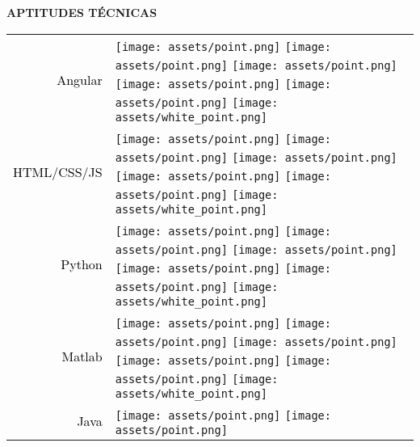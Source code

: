 \documentclass[../main.tex]{subfiles}
\begin{document}
\vspace*{0.5cm}

\textbf{\textcolor{myCV2}{APTITUDES TÉCNICAS\underline{\hspace{3.5cm}}}}
\vspace*{0.2cm}

    \begin{tabular}{r l}
    \textcolor{black}{\vspace*{0.1cm}Angular} &            
            \texttt{[image: assets/point.png]}
            \texttt{[image: assets/point.png]}
            \texttt{[image: assets/point.png]}
            \texttt{[image: assets/point.png]}
            \texttt{[image: assets/point.png]}
            \texttt{[image: assets/white\_point.png]}\\
    \textcolor{black}{\vspace*{0.1cm}HTML/CSS/JS} &
            \texttt{[image: assets/point.png]}
            \texttt{[image: assets/point.png]}
            \texttt{[image: assets/point.png]}
            \texttt{[image: assets/point.png]}
            \texttt{[image: assets/point.png]}
            \texttt{[image: assets/white\_point.png]}\\
    \textcolor{black}{\vspace*{0.1cm}Python} &
            \texttt{[image: assets/point.png]}
            \texttt{[image: assets/point.png]}
            \texttt{[image: assets/point.png]}
            \texttt{[image: assets/point.png]}
            \texttt{[image: assets/point.png]}
            \texttt{[image: assets/white\_point.png]}\\
    \textcolor{black}{\vspace*{0.1cm}Matlab} &
            \texttt{[image: assets/point.png]}
            \texttt{[image: assets/point.png]}
            \texttt{[image: assets/point.png]}
            \texttt{[image: assets/point.png]}
            \texttt{[image: assets/point.png]}
            \texttt{[image: assets/white\_point.png]}\\
    \textcolor{black}{\vspace*{0.1cm}Java} &
            \texttt{[image: assets/point.png]}
            \texttt{[image: assets/point.png]}

\end{tabular}
\end{document}
